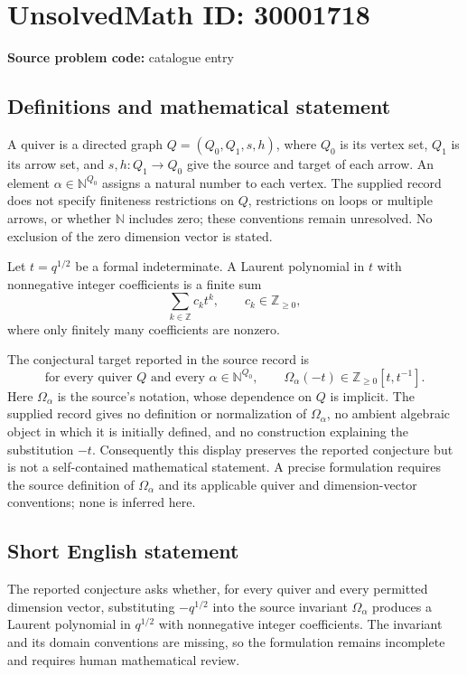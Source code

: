 \documentclass[11pt]{article}
\begin{document}
\section*{UnsolvedMath ID: 30001718}
\textbf{Source problem code:} catalogue entry
\subsection{Definitions and mathematical statement}
A quiver is a directed graph \(Q=(Q_0,Q_1,s,h)\), where \(Q_0\) is its vertex set, \(Q_1\) is its arrow set, and \(s,h:Q_1\to Q_0\) give the source and target of each arrow. An element \(\alpha\in\mathbb N^{Q_0}\) assigns a natural number to each vertex. The supplied record does not specify finiteness restrictions on \(Q\), restrictions on loops or multiple arrows, or whether \(\mathbb N\) includes zero; these conventions remain unresolved. No exclusion of the zero dimension vector is stated.

Let \(t=q^{1/2}\) be a formal indeterminate. A Laurent polynomial in \(t\) with nonnegative integer coefficients is a finite sum
\[
\sum_{k\in\mathbb Z}c_k t^k,\qquad c_k\in\mathbb Z_{\geq 0},
\]
where only finitely many coefficients are nonzero.

The conjectural target reported in the source record is
\[
\text{for every quiver }Q\text{ and every }\alpha\in\mathbb N^{Q_0},\qquad
\Omega_\alpha(-t)\in\mathbb Z_{\geq 0}[t,t^{-1}].
\]
Here \(\Omega_\alpha\) is the source's notation, whose dependence on \(Q\) is implicit. The supplied record gives no definition or normalization of \(\Omega_\alpha\), no ambient algebraic object in which it is initially defined, and no construction explaining the substitution \(-t\). Consequently this display preserves the reported conjecture but is not a self-contained mathematical statement. A precise formulation requires the source definition of \(\Omega_\alpha\) and its applicable quiver and dimension-vector conventions; none is inferred here.
\subsection{Short English statement}
The reported conjecture asks whether, for every quiver and every permitted dimension vector, substituting \(-q^{1/2}\) into the source invariant \(\Omega_\alpha\) produces a Laurent polynomial in \(q^{1/2}\) with nonnegative integer coefficients. The invariant and its domain conventions are missing, so the formulation remains incomplete and requires human mathematical review.
\end{document}
